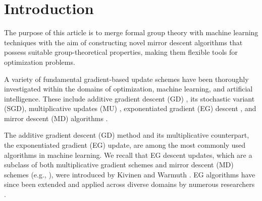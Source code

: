 \documentclass[10pt]{amsart}
\theoremstyle{definition}
\theoremstyle{definition}	 %
\begin{document}
\begin{abstract}

\end{abstract}




\tableofcontents

\section{Introduction}
The purpose of this article is to merge formal group theory with
machine learning techniques with the aim of constructing novel mirror descent algorithms that possess suitable group-theoretical properties, making them flexible tools for optimization problems.

A variety of fundamental gradient-based update schemes have been thoroughly investigated within the domains of optimization, machine learning, and artificial intelligence. These include additive gradient descent (GD) \cite{Nemirowsky,EGSD}, its stochastic variant (SGD), multiplicative updates (MU) \cite{Cia3,Cichocki_Cruces_Amari,CichZd_ICA06}, exponentiated gradient (EG) descent \cite{EG,MD2}, and mirror descent (MD) algorithms \cite{Nemirowsky,MD1,Beck2003,EGSD,shalev2011}.


The additive gradient descent (GD) method and its multiplicative counterpart, the exponentiated gradient (EG) update, are among the most commonly used algorithms in machine learning. We recall that EG descent updates, which are a subclass of both multiplicative gradient schemes \cite{Cia3} and mirror descent (MD) schemes (e.g., \cite{MD1,EGSD}), were introduced by  Kivinen and Warmuth \cite{EG,KW1995}. EG algorithms have since been extended and applied across diverse domains by numerous researchers \cite{Helmbold98,herbsterwarmuth,EGnoise,Nock2023,Yang2022,Momentum,EGSD}.
\end{document}
